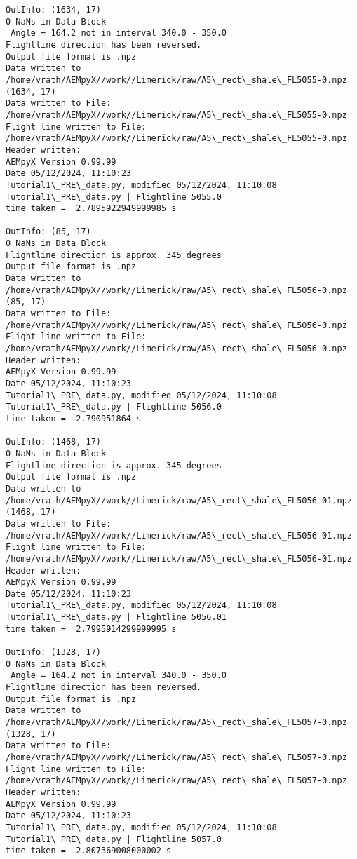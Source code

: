 \documentclass[11pt]{article}
\begin{document}
\begin{Verbatim}[commandchars=\\\{\}]
OutInfo: (1634, 17)
0 NaNs in Data Block
 Angle = 164.2 not in interval 340.0 - 350.0
Flightline direction has been reversed.
Output file format is .npz
Data written to
/home/vrath/AEMpyX//work//Limerick/raw/A5\_rect\_shale\_FL5055-0.npz
(1634, 17)
Data written to File:
/home/vrath/AEMpyX//work//Limerick/raw/A5\_rect\_shale\_FL5055-0.npz
Flight line written to File:
/home/vrath/AEMpyX//work//Limerick/raw/A5\_rect\_shale\_FL5055-0.npz
Header written:
AEMpyX Version 0.99.99
Date 05/12/2024, 11:10:23
Tutorial1\_PRE\_data.py, modified 05/12/2024, 11:10:08
Tutorial1\_PRE\_data.py | Flightline 5055.0
time taken =  2.7895922949999985 s

OutInfo: (85, 17)
0 NaNs in Data Block
Flightline direction is approx. 345 degrees
Output file format is .npz
Data written to
/home/vrath/AEMpyX//work//Limerick/raw/A5\_rect\_shale\_FL5056-0.npz
(85, 17)
Data written to File:
/home/vrath/AEMpyX//work//Limerick/raw/A5\_rect\_shale\_FL5056-0.npz
Flight line written to File:
/home/vrath/AEMpyX//work//Limerick/raw/A5\_rect\_shale\_FL5056-0.npz
Header written:
AEMpyX Version 0.99.99
Date 05/12/2024, 11:10:23
Tutorial1\_PRE\_data.py, modified 05/12/2024, 11:10:08
Tutorial1\_PRE\_data.py | Flightline 5056.0
time taken =  2.790951864 s

OutInfo: (1468, 17)
0 NaNs in Data Block
Flightline direction is approx. 345 degrees
Output file format is .npz
Data written to
/home/vrath/AEMpyX//work//Limerick/raw/A5\_rect\_shale\_FL5056-01.npz
(1468, 17)
Data written to File:
/home/vrath/AEMpyX//work//Limerick/raw/A5\_rect\_shale\_FL5056-01.npz
Flight line written to File:
/home/vrath/AEMpyX//work//Limerick/raw/A5\_rect\_shale\_FL5056-01.npz
Header written:
AEMpyX Version 0.99.99
Date 05/12/2024, 11:10:23
Tutorial1\_PRE\_data.py, modified 05/12/2024, 11:10:08
Tutorial1\_PRE\_data.py | Flightline 5056.01
time taken =  2.7995914299999995 s

OutInfo: (1328, 17)
0 NaNs in Data Block
 Angle = 164.2 not in interval 340.0 - 350.0
Flightline direction has been reversed.
Output file format is .npz
Data written to
/home/vrath/AEMpyX//work//Limerick/raw/A5\_rect\_shale\_FL5057-0.npz
(1328, 17)
Data written to File:
/home/vrath/AEMpyX//work//Limerick/raw/A5\_rect\_shale\_FL5057-0.npz
Flight line written to File:
/home/vrath/AEMpyX//work//Limerick/raw/A5\_rect\_shale\_FL5057-0.npz
Header written:
AEMpyX Version 0.99.99
Date 05/12/2024, 11:10:23
Tutorial1\_PRE\_data.py, modified 05/12/2024, 11:10:08
Tutorial1\_PRE\_data.py | Flightline 5057.0
time taken =  2.807369008000002 s


\end{Verbatim}
\end{document}
